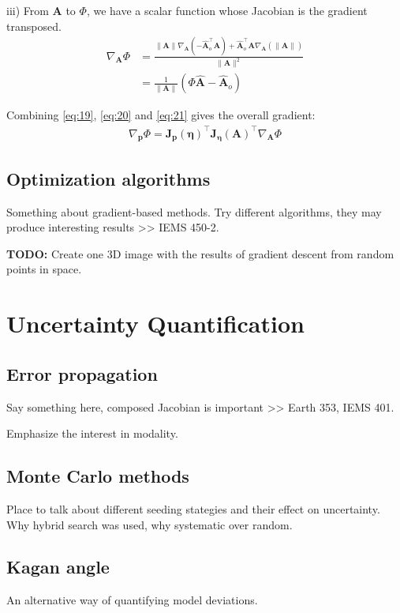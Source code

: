 \documentclass[preprint]{seismica}
\begin{document}
    iii) From $\bm{A}$ to $\Phi$, we have a scalar function whose Jacobian is the gradient
    transposed.
    \begin{align} \label{eq:21}
      \nonumber\nabla_{\bm{A}}\Phi &= \frac{\|\bm{A}\|\nabla_{\bm{A}}(-\hat{\bm{A}}_o^\top\bm{A}) + 
      \hat{\bm{A}}_o^\top \bm{A} \nabla_{\bm{A}}(\|\bm{A}\|)}{\|\bm{A}\|^2}\\
            &= \frac{1}{\|\bm{A}\|}(\Phi\hat{\bm{A}} - \hat{\bm{A}}_o)
    \end{align}

    Combining \ref{eq:19}, \ref{eq:20} and \ref{eq:21} gives the overall gradient:
    \begin{align} \label{eq:22}
      \nabla_{\bm{p}}\Phi = \bm{J_p}(\bm{\eta})^\top \bm{J_\eta}(\bm{A})^\top \nabla_{\bm{A}}\Phi
    \end{align}

  \subsection{Optimization algorithms}
    Something about gradient-based methods. Try different algorithms, they may produce
    interesting results >> IEMS 450-2.

    \noindent \textbf{TODO:} Create one 3D image with the results of gradient descent from random points in space.


\section{Uncertainty Quantification} \label{sec:uncertainty}

    \subsection{Error propagation}
      Say something here, composed Jacobian is important >> Earth 353, IEMS 401.

      \noindent Emphasize the interest in modality.

    \subsection{Monte Carlo methods}
      Place to talk about different seeding stategies and their effect on uncertainty.
      Why hybrid search was used, why systematic over random.
    
    \subsection{Kagan angle}
      An alternative way of quantifying model deviations.
\end{document}
